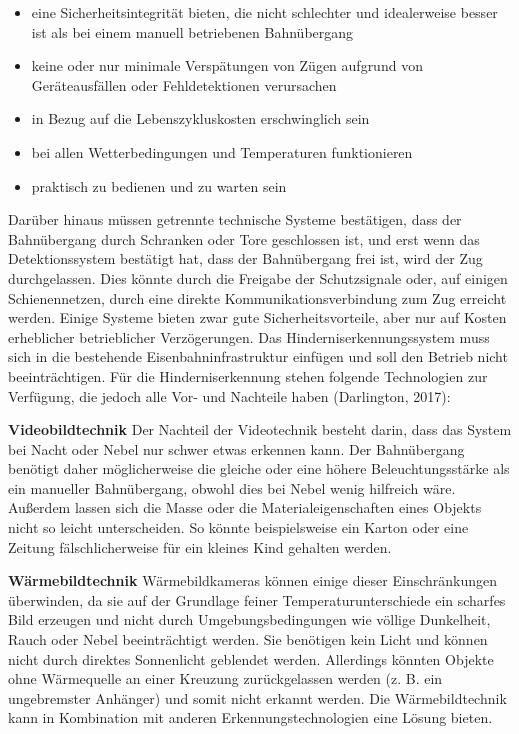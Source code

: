 \documentclass[
]{book}
\providecommand{\tightlist}{%
  \setlength{\itemsep}{0pt}\setlength{\parskip}{0pt}}
\begin{document}
\begin{itemize}
\tightlist
\item
  eine Sicherheitsintegrität bieten, die nicht schlechter und idealerweise besser ist als bei einem manuell betriebenen Bahnübergang
\item
  keine oder nur minimale Verspätungen von Zügen aufgrund von Geräteausfällen oder Fehldetektionen verursachen
\item
  in Bezug auf die Lebenszykluskosten erschwinglich sein
\item
  bei allen Wetterbedingungen und Temperaturen funktionieren
\item
  praktisch zu bedienen und zu warten sein
\end{itemize}

Darüber hinaus müssen getrennte technische Systeme bestätigen, dass der Bahnübergang durch Schranken oder Tore geschlossen ist, und erst wenn das Detektionssystem bestätigt hat, dass der Bahnübergang frei ist, wird der Zug durchgelassen. Dies könnte durch die Freigabe der Schutzsignale oder, auf einigen Schienennetzen, durch eine direkte Kommunikationsverbindung zum Zug erreicht werden. Einige Systeme bieten zwar gute Sicherheitsvorteile, aber nur auf Kosten erheblicher betrieblicher Verzögerungen. Das Hinderniserkennungssystem muss sich in die bestehende Eisenbahninfrastruktur einfügen und soll den Betrieb nicht beeinträchtigen.
Für die Hinderniserkennung stehen folgende Technologien zur Verfügung, die jedoch alle Vor- und Nachteile haben (Darlington, 2017):

\textbf{Videobildtechnik}
Der Nachteil der Videotechnik besteht darin, dass das System bei Nacht oder Nebel nur schwer etwas erkennen kann. Der Bahnübergang benötigt daher möglicherweise die gleiche oder eine höhere Beleuchtungsstärke als ein manueller Bahnübergang, obwohl dies bei Nebel wenig hilfreich wäre. Außerdem lassen sich die Masse oder die Materialeigenschaften eines Objekts nicht so leicht unterscheiden. So könnte beispielsweise ein Karton oder eine Zeitung fälschlicherweise für ein kleines Kind gehalten werden.

\textbf{Wärmebildtechnik}
Wärmebildkameras können einige dieser Einschränkungen überwinden, da sie auf der Grundlage feiner Temperaturunterschiede ein scharfes Bild erzeugen und nicht durch Umgebungsbedingungen wie völlige Dunkelheit, Rauch oder Nebel beeinträchtigt werden. Sie benötigen kein Licht und können nicht durch direktes Sonnenlicht geblendet werden. Allerdings könnten Objekte ohne Wärmequelle an einer Kreuzung zurückgelassen werden (z. B. ein ungebremster Anhänger) und somit nicht erkannt werden. Die Wärmebildtechnik kann in Kombination mit anderen Erkennungstechnologien eine Lösung bieten.
\end{document}
